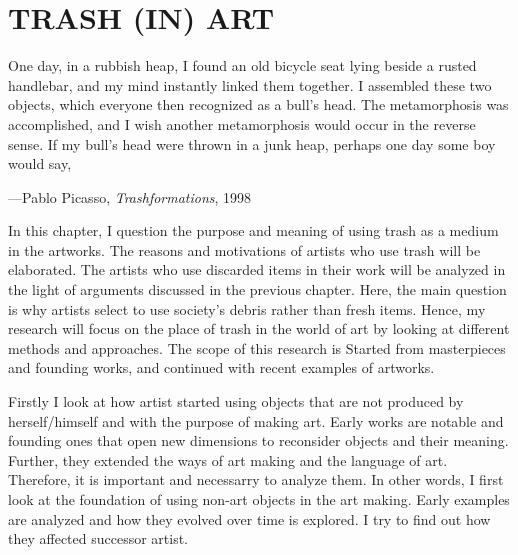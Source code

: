 \chapter{TRASH (IN) ART}




\begin{singlespace}
\epigraph{One day, in a rubbish heap, I found an old bicycle seat lying beside a rusted handlebar, and my mind instantly linked them together. I assembled these two objects, which everyone then recognized as a bull’s head. The metamorphosis was accomplished, and I wish another metamorphosis would occur in the reverse sense. If my bull’s head were thrown in a junk heap, perhaps one day some boy would say, }{\hfill ---Pablo Picasso, \textit{Trashformations}, 1998}
\end{singlespace}





In this chapter, I question the purpose and meaning of using trash as a medium in the artworks. The reasons and motivations of artists who use trash will be elaborated. The artists who use discarded items in their work will be analyzed in the light of arguments discussed in the previous chapter. Here, the main question is why artists select to use society's debris rather than fresh items. Hence, my research will focus on the place of trash in the world of art by looking at different methods and approaches. The scope of this research is Started from masterpieces and founding works, and continued with recent examples of artworks.  



Firstly I look at how artist started using objects that are not produced by herself/himself and with the purpose of making art. Early works are notable and founding ones that open new dimensions to reconsider objects and their meaning. Further, they extended the ways of art making and the language of art. Therefore, it is important and necessarry to analyze them. In other words, I first look at the foundation of using non-art objects in the art making. Early examples are analyzed and how they evolved over time is explored. I try to find out how they affected successor artist.

